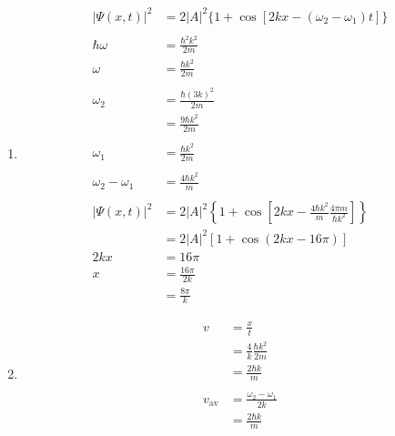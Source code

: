 \documentclass{article}
\begin{document}
\begin{enumerate}
  \item

        \begin{align*}
          |\Psi(x, t)|^2      & = 2 |A|^2 \{1 + \cos [2 k x - (\omega_2 - \omega_1) t]\}                                                   \\ \\
          \hbar \omega        & = \frac{\hbar^2 k^2}{2 m}                                                                                  \\
          \omega              & = \frac{\hbar k^2}{2 m}                                                                                    \\ \\
          \omega_2            & = \frac{\hbar (3 k)^2}{2 m}                                                                                \\
                              & = \frac{9 \hbar k^2}{2 m}                                                                                  \\ \\
          \omega_1            & = \frac{\hbar k^2}{2 m}                                                                                    \\ \\
          \omega_2 - \omega_1 & = \frac{4 \hbar k^2}{m}                                                                                    \\ \\
          |\Psi(x, t)|^2      & = 2 |A|^2 \left\{ 1 + \cos \left[ 2 k x - \frac{4 \hbar k^2}{m} \frac{4 \pi m}{\hbar k^2} \right] \right\} \\
                              & = 2 |A|^2 [1 + \cos (2 k x - 16 \pi)]                                                                      \\
          2 k x               & = 16 \pi                                                                                                   \\
          x                   & = \frac{16 \pi}{2 k}                                                                                       \\
                              & = \frac{8 \pi}{k}
        \end{align*}

  \item

        \begin{align*}
          v           & = \frac{x}{t}                       \\
                      & = \frac{4}{k} \frac{\hbar k^2}{2 m} \\
                      & = \frac{2 \hbar k}{m}               \\ \\
          v_\text{av} & = \frac{\omega_2 - \omega_1}{2 k}   \\
                      & = \frac{2 \hbar k}{m}
        \end{align*}
\end{enumerate}
\end{document}
